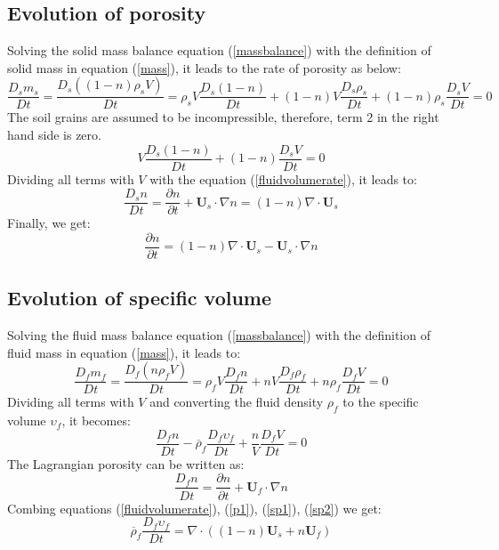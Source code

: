 \documentclass[preprint,12pt]{elsarticle}
\begin{document}
\subsection{\textsf{Evolution of porosity}}
%
%
Solving the solid mass balance equation (\ref{massbalance}) with the definition of solid mass in equation (\ref{mass}), it leads to the rate of porosity as below:
%
%
\begin{equation}
   \frac{D_sm_s}{Dt} = \frac{D_s((1-n) \rho_s V)}{Dt} = \rho_s V \frac{D_s(1-n)}{Dt} + (1-n) V \frac{D_s \rho_s}{Dt} + (1-n) \rho_s  \frac{D_s V}{Dt} = 0  
\end{equation}
%
%
The soil grains are assumed to be incompressible, therefore, term 2 in the right hand side is zero. 
%
%
\begin{equation}
  V \frac{D_s(1-n)}{Dt} + (1-n) \frac{D_s V}{Dt} = 0  
\end{equation}
%
%
Dividing all terms with $V$ with the equation (\ref{fluidvolumerate}), it leads to:
%
%
\begin{equation}
  \frac{D_s n}{Dt} = \frac{\partial n}{\partial t} + \pmb{U}_s \cdot \nabla n = 
  (1-n) \nabla \cdot \pmb{U}_s  
\end{equation}
%
%
Finally, we get:
%
%
\begin{equation}
\label{p1}
\frac{\partial n}{\partial t} = (1-n) \nabla \cdot \pmb{U}_s  - \pmb{U}_s \cdot \nabla n
\end{equation}
%
%
\subsection{\textsf{Evolution of specific volume}}
%
%
Solving the fluid mass balance equation (\ref{massbalance}) with the definition of fluid mass in equation (\ref{mass}), it leads to:
%
%
\begin{equation}
   \frac{D_fm_f}{Dt} = \frac{D_f(n \rho_f V)}{Dt} = \rho_f V \frac{D_f n}{Dt} + n V \frac{D_f \rho_f}{Dt} + n \rho_f  \frac{D_f V}{Dt} = 0  
\end{equation}
%
%
Dividing all terms with $V$ and converting the fluid density $\rho_f$ to the specific volume $\upsilon_f$, it becomes:
%
%
\begin{equation}
\label{sp1}
   \frac{D_f n}{Dt} - \overline{\rho}_f \frac{D_f \upsilon_f}{Dt} + \frac{n}{V} \frac{D_f V}{Dt} = 0  
\end{equation}
%
%
The Lagrangian porosity can be written as:
%
%
\begin{equation}
\label{sp2}
   \frac{D_f n}{Dt} = \frac{\partial n}{\partial t} + \pmb{U}_f \cdot \nabla n 
\end{equation}
%
%
Combing equations (\ref{fluidvolumerate}), (\ref{p1}), (\ref{sp1}), (\ref{sp2}) we get:
\begin{equation}
\overline{\rho}_f \frac{D_f\upsilon_f}{Dt} = \nabla \cdot ((1-n)\pmb{U}_s + n \pmb{U}_f)
\end{equation}
%
%
\end{document}
